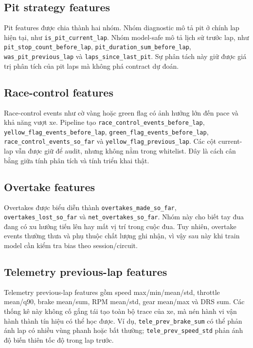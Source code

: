 \documentclass[conference]{IEEEtran}
\begin{document}
\subsection{Pit strategy features}
Pit features được chia thành hai nhóm. Nhóm diagnostic mô tả pit ở chính lap hiện tại, như \texttt{is\_pit\_current\_lap}. Nhóm model-safe mô tả lịch sử trước lap, như \texttt{pit\_stop\_count\_before\_lap}, \texttt{pit\_duration\_sum\_before\_lap}, \texttt{was\_pit\_previous\_lap} và \texttt{laps\_since\_last\_pit}. Sự phân tách này giữ được giá trị phân tích của pit laps mà không phá contract dự đoán.

\subsection{Race-control features}
Race-control events như cờ vàng hoặc green flag có ảnh hưởng lớn đến pace và khả năng vượt xe. Pipeline tạo \texttt{race\_control\_events\_before\_lap}, \texttt{yellow\_flag\_events\_before\_lap}, \texttt{green\_flag\_events\_before\_lap}, \texttt{race\_control\_events\_so\_far} và \texttt{yellow\_flag\_previous\_lap}. Các cột current-lap vẫn được giữ để audit, nhưng không nằm trong whitelist. Đây là cách cân bằng giữa tính phân tích và tính triển khai thật.

\subsection{Overtake features}
Overtakes được biểu diễn thành \texttt{overtakes\_made\_so\_far}, \texttt{overtakes\_lost\_so\_far} và \texttt{net\_overtakes\_so\_far}. Nhóm này cho biết tay đua đang có xu hướng tiến lên hay mất vị trí trong cuộc đua. Tuy nhiên, overtake events thường thưa và phụ thuộc chất lượng ghi nhận, vì vậy sau này khi train model cần kiểm tra bias theo session/circuit.

\subsection{Telemetry previous-lap features}
Telemetry previous-lap features gồm speed max/min/mean/std, throttle mean/q90, brake mean/sum, RPM mean/std, gear mean/max và DRS sum. Các thống kê này không cố gắng tái tạo toàn bộ trace của xe, mà nén hành vi vận hành thành tín hiệu có thể học được. Ví dụ, \texttt{tele\_prev\_brake\_sum} có thể phản ánh lap có nhiều vùng phanh hoặc bất thường; \texttt{tele\_prev\_speed\_std} phản ánh độ biến thiên tốc độ trong lap trước.
\end{document}
